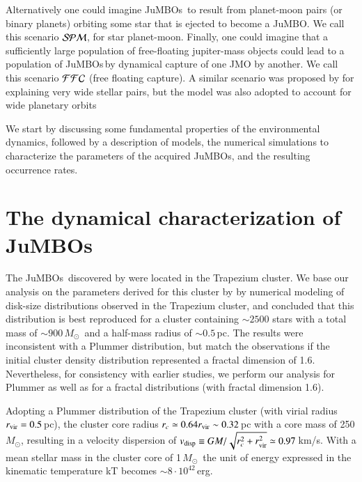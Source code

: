\documentclass[submission,phys]{lib/SciPost}
\newcommand{\MSun}{\mbox{${M}_\odot$}}
\newcommand{\jumbo}{\mbox{JuMBO}}
\newcommand{\jumbos}{\mbox{JuMBOs}}
\begin{document}
Alternatively one could imagine \jumbos\, to result from planet-moon
pairs (or binary planets) orbiting some star that is ejected to become
a \jumbo.  We call this scenario ${\cal SPM}$, for star planet-moon.
Finally, one could imagine that a sufficiently large population of
free-floating jupiter-mass objects could lead to a population of
\jumbos\,by dynamical capture of one JMO by another.  We call this
scenario ${\cal FFC}$ (free floating capture). A similar scenario was
proposed by \cite{2010MNRAS.404.1835K} for explaining very wide
stellar pairs, but the model was also adopted to account for wide
planetary orbits \cite{2012ApJ...750...83P,2018MNRAS.473.1589G}

We start by discussing some fundamental properties of the
environmental dynamics, followed by a description of models, the
numerical simulations to characterize the parameters of the acquired
\jumbos, and the resulting occurrence rates.

\section{The dynamical characterization of \jumbos}

The \jumbos\, discovered by \cite{2023arXiv231001231P} were located in
the Trapezium cluster. We base our analysis on the parameters derived
for this cluster by \cite{2016MNRAS.457..313P} by numerical modeling
of disk-size distributions observed in the Trapezium cluster, and
concluded that this distribution is best reproduced for a cluster
containing $\sim 2500$ stars with a total mass of $\sim 900$\,\MSun\,
and a half-mass radius of $\sim 0.5$\,pc. The results were
inconsistent with a Plummer \cite{1911MNRAS..71..460P} distribution,
but match the observations if the initial cluster density distribution
represented a fractal dimension of 1.6.  Nevertheless, for consistency
with earlier studies, we perform our analysis for Plummer as well as
for a fractal distributions (with fractal dimension 1.6).

Adopting a Plummer distribution of the Trapezium cluster (with virial
radius $r_{\rm vir} = 0.5$\,pc), the cluster core radius $r_c \simeq
0.64r_{\rm vir} \sim 0.32$\,pc with a core mass of 250\,\MSun,
resulting in a velocity dispersion of $v_{\rm disp} \equiv
GM/\sqrt{r_c^2 + r_{\rm vir}^2} \simeq 0.97$\,km/s. With a mean
stellar mass in the cluster core of 1\,\MSun\, the unit of energy
expressed in the kinematic temperature kT becomes $\sim 8 \cdot
10^{42}$\,erg.
\end{document}

